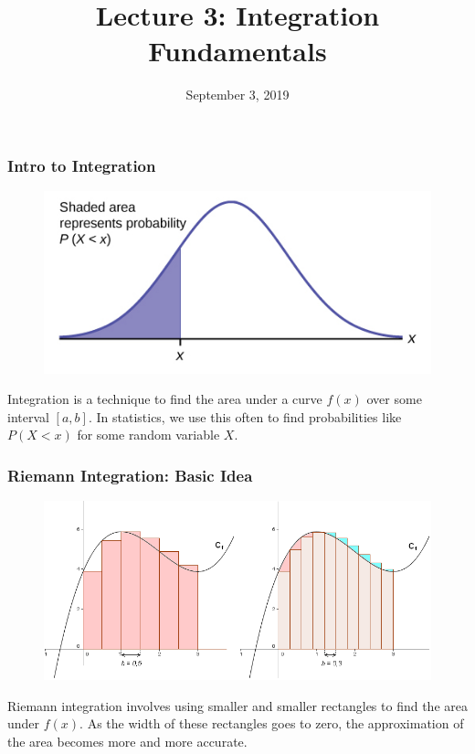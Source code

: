 \documentclass{beamer}
\title{\textbf{Lecture 3: Integration Fundamentals}}
\date{September 3, 2019}
\begin{document}
	
\frame{\titlepage}

\begin{frame}
\frametitle{\textbf{Intro to Integration}}

\begin{figure}
	\centering
	\includegraphics[height=.4\textheight]{normal-dist.jpg}\\
	\hspace*{10pt}\hbox{}
\end{figure}

Integration is a technique to find the area under a curve $f(x)$ over some interval $[a,b]$. In statistics, we use this often to find probabilities like $P(X<x)$ for some random variable $X$.

\end{frame}

\begin{frame}
\frametitle{\textbf{Riemann Integration: Basic Idea}}

\begin{figure}
	\centering
	\includegraphics[height=.4\textheight]{subintervals.png}\\
	\hspace*{10pt}\hbox{}
\end{figure}

Riemann integration involves using smaller and smaller rectangles to find the area under $f(x)$. As the width of these rectangles goes to zero, the approximation of the area becomes more and more accurate.
\end{frame}
\end{document}

